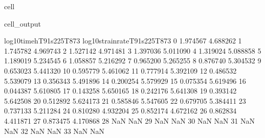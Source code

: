 \documentclass[letterpaper,10pt,english]{jupyterBook}
\begin{document}
\begin{sphinxuseclass}{cell}
\begin{sphinxVerbatimOutput}
\begin{sphinxuseclass}{cell_output}
\begin{sphinxVerbatim}[commandchars=\\\{\}]
					log10timeh\PYGZus{}T91s225T873  log10strainrate\PYGZus{}T91s225T873  \PYGZbs{}
					0                \PYGZhy{}1.974567                    \PYGZhy{}4.688262   
					1                \PYGZhy{}1.745782                    \PYGZhy{}4.969743   
					2                \PYGZhy{}1.527142                    \PYGZhy{}4.971481   
					3                \PYGZhy{}1.397036                    \PYGZhy{}5.011090   
					4                \PYGZhy{}1.319024                    \PYGZhy{}5.088858   
					5                \PYGZhy{}1.189019                    \PYGZhy{}5.234545   
					6                \PYGZhy{}1.058857                    \PYGZhy{}5.216292   
					7                \PYGZhy{}0.965200                    \PYGZhy{}5.265255   
					8                \PYGZhy{}0.876740                    \PYGZhy{}5.304532   
					9                \PYGZhy{}0.653023                    \PYGZhy{}5.441320   
					10               \PYGZhy{}0.595779                    \PYGZhy{}5.461062   
					11               \PYGZhy{}0.777914                    \PYGZhy{}5.392109   
					12               \PYGZhy{}0.486532                    \PYGZhy{}5.539079   
					13               \PYGZhy{}0.356343                    \PYGZhy{}5.491896   
					14               \PYGZhy{}0.200254                    \PYGZhy{}5.579929   
					15               \PYGZhy{}0.075354                    \PYGZhy{}5.619496   
					16                0.044387                    \PYGZhy{}5.610805   
					17                0.143258                    \PYGZhy{}5.650165   
					18                0.242176                    \PYGZhy{}5.641308   
					19                0.393142                    \PYGZhy{}5.642508   
					20                0.512892                    \PYGZhy{}5.624173   
					21                0.585846                    \PYGZhy{}5.547605   
					22                0.679705                    \PYGZhy{}5.384411   
					23                0.737133                    \PYGZhy{}5.211284   
					24                0.810280                    \PYGZhy{}4.932204   
					25                0.852174                    \PYGZhy{}4.672162   
					26                0.862834                    \PYGZhy{}4.411871   
					27                0.873475                    \PYGZhy{}4.170868   
					28                     NaN                          NaN   
					29                     NaN                          NaN   
					30                     NaN                          NaN   
					31                     NaN                          NaN   
					32                     NaN                          NaN   
					33                     NaN                          NaN   

\end{sphinxVerbatim}
\end{sphinxuseclass}
\end{sphinxVerbatimOutput}
\end{sphinxuseclass}
\end{document}
